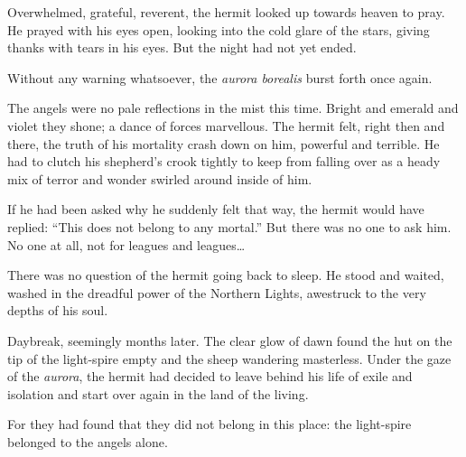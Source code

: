 Overwhelmed, grateful, reverent, the hermit looked up towards heaven to pray. He prayed with his eyes open, looking into the cold glare of the stars, giving thanks with tears in his eyes. But the night had not yet ended. 

Without any warning whatsoever, the \emph{aurora borealis} burst forth once again. 

The angels were no pale reflections in the mist this time. Bright and emerald and violet they shone; a dance of forces marvellous. The hermit felt, right then and there, the truth of his mortality crash down on him, powerful and terrible. He had to clutch his shepherd’s crook tightly to keep from falling over as a heady mix of terror and wonder swirled around inside of him. 

If he had been asked why he suddenly felt that way, the hermit would have replied: “This does not belong to any mortal.” But there was no one to ask him. No one at all, not for leagues and leagues… 

There was no question of the hermit going back to sleep. He stood and waited, washed in the dreadful power of the Northern Lights, awestruck to the very depths of his soul. 

Daybreak, seemingly months later. The clear glow of dawn found the hut on the tip of the light-spire empty and the sheep wandering masterless. Under the gaze of the \emph{aurora}, the hermit had decided to leave behind his life of exile and isolation and start over again in the land of the living. 

For they had found that they did not belong in this place: the light-spire belonged to the angels alone. 
